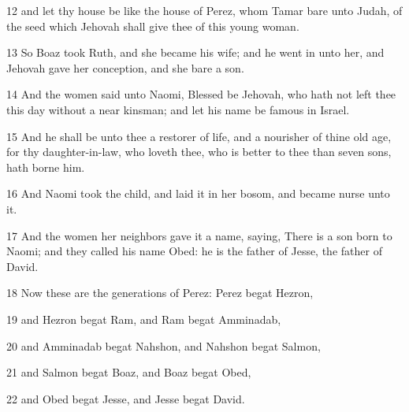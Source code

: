 \par 12 and let thy house be like the house of Perez, whom Tamar bare unto Judah, of the seed which Jehovah shall give thee of this young woman.
\par 13 So Boaz took Ruth, and she became his wife; and he went in unto her, and Jehovah gave her conception, and she bare a son.
\par 14 And the women said unto Naomi, Blessed be Jehovah, who hath not left thee this day without a near kinsman; and let his name be famous in Israel.
\par 15 And he shall be unto thee a restorer of life, and a nourisher of thine old age, for thy daughter-in-law, who loveth thee, who is better to thee than seven sons, hath borne him.
\par 16 And Naomi took the child, and laid it in her bosom, and became nurse unto it.
\par 17 And the women her neighbors gave it a name, saying, There is a son born to Naomi; and they called his name Obed: he is the father of Jesse, the father of David.
\par 18 Now these are the generations of Perez: Perez begat Hezron,
\par 19 and Hezron begat Ram, and Ram begat Amminadab,
\par 20 and Amminadab begat Nahshon, and Nahshon begat Salmon,
\par 21 and Salmon begat Boaz, and Boaz begat Obed,
\par 22 and Obed begat Jesse, and Jesse begat David.

